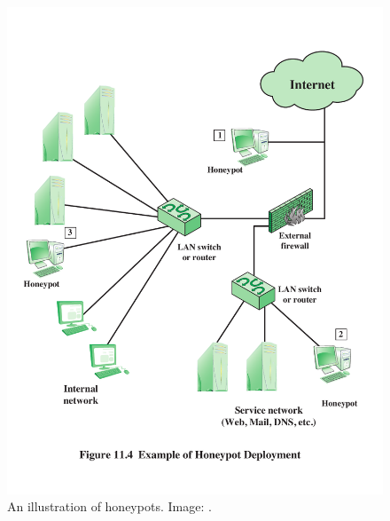 \begin{frame}
  \begin{figure}
    \includegraphics[height=0.7\textheight]{figs/honeypot.pdf}
    \caption{An illustration of honeypots.
      Image: \cite{Stallings2013nse}.}
  \end{figure}
\end{frame}


